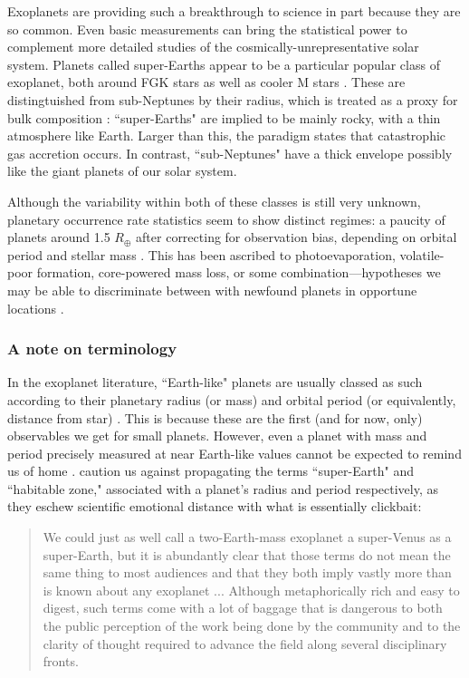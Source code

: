 Exoplanets are providing such a breakthrough to science in part because they are so common. Even basic measurements can bring the statistical power to complement more detailed studies of the cosmically-unrepresentative solar system. Planets called super-Earths appear to be a particular popular class of exoplanet, both around FGK stars as well as cooler M stars \citep{Petigura2013, Foreman-Mackey2014, Dressing2015}. These are distingtuished from sub-Neptunes by their radius, which is treated as a proxy for bulk composition \citep{Lopez2014}: ``super-Earths" are implied to be mainly rocky, with a thin atmosphere like Earth. Larger than this, the paradigm states that catastrophic gas accretion occurs. In contrast, ``sub-Neptunes" have a thick envelope possibly like the giant planets of our solar system.

Although the variability within both of these classes is still very unknown, planetary occurrence rate statistics seem to show distinct regimes: a paucity of planets around 1.5 $R_\oplus$ after correcting for observation bias, depending on orbital period and stellar mass \citep{Fulton2017, Cloutier2020}. This has been ascribed to photoevaporation, volatile-poor formation, core-powered mass loss, or some combination---hypotheses we may be able to discriminate between with newfound planets in opportune locations \citep{Cloutier2020b}.


\subsubsection{A note on terminology}
In the exoplanet literature, ``Earth-like" planets are usually classed as such according to their planetary radius (or mass) and orbital period (or equivalently, distance from star) \citep{Guimond2018}. This is because these are the first (and for now, only) observables we get for small planets. However, even a planet with mass and period precisely measured at near Earth-like values cannot be expected to remind us of home \citep{Tasker2017}. \citet{Moore2017} caution us against propagating the terms ``super-Earth" and ``habitable zone," associated with a planet's radius and period respectively, as they eschew scientific emotional distance with what is essentially clickbait:
\begin{quote}
We could just as well call a two-Earth-mass exoplanet a super-Venus as a super-Earth, but it is abundantly clear that those terms do not mean the same thing to most audiences and that they both imply vastly more than is known about any exoplanet ... Although metaphorically rich and easy to digest, such terms come with a lot of baggage that is dangerous to both the public perception of the work being done by the community and to the clarity of thought required to advance the field along several disciplinary fronts.
\end{quote}

